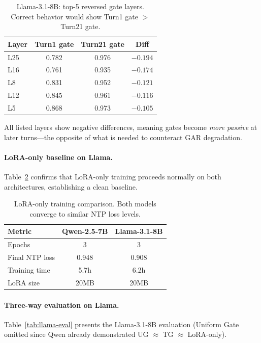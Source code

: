 \documentclass[11pt,a4paper]{article}
\newcommand{\gar}{\textsc{GAR}}
\begin{document}
\begin{table}[H]
\centering
\caption{Llama-3.1-8B: top-5 reversed gate layers. Correct behavior would show Turn1 gate $>$ Turn21 gate.}
\label{tab:llama-gate-reversal}
\begin{tabular}{lccc}
\toprule
\textbf{Layer} & \textbf{Turn1 gate} & \textbf{Turn21 gate} & \textbf{Diff} \\
\midrule
L25 & 0.782 & 0.976 & $-0.194$ \\
L16 & 0.761 & 0.935 & $-0.174$ \\
L8  & 0.831 & 0.952 & $-0.121$ \\
L12 & 0.845 & 0.961 & $-0.116$ \\
L5  & 0.868 & 0.973 & $-0.105$ \\
\bottomrule
\end{tabular}
\end{table}

All listed layers show negative differences, meaning gates become \emph{more passive} at later turns---the opposite of what is needed to counteract \gar{} degradation.

\paragraph{LoRA-only baseline on Llama.}
Table~\ref{tab:lora-crossmodel} confirms that LoRA-only training proceeds normally on both architectures, establishing a clean baseline.

\begin{table}[H]
\centering
\caption{LoRA-only training comparison. Both models converge to similar NTP loss levels.}
\label{tab:lora-crossmodel}
\begin{tabular}{lcc}
\toprule
\textbf{Metric} & \textbf{Qwen-2.5-7B} & \textbf{Llama-3.1-8B} \\
\midrule
Epochs          & 3     & 3 \\
Final NTP loss  & 0.948 & 0.908 \\
Training time   & 5.7h  & 6.2h \\
LoRA size       & 20MB  & 20MB \\
\bottomrule
\end{tabular}
\end{table}

\paragraph{Three-way evaluation on Llama.}
Table~\ref{tab:llama-eval} presents the Llama-3.1-8B evaluation (Uniform Gate omitted since Qwen already demonstrated UG $\approx$ TG $\approx$ LoRA-only).
\end{document}
